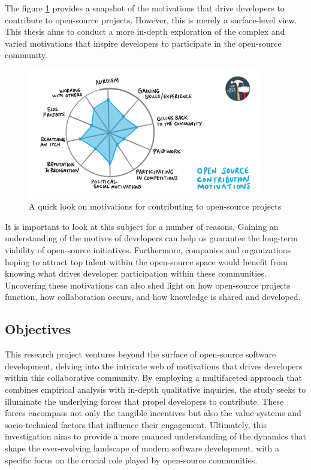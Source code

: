 The figure \ref{fig:illustration} provides a snapshot of the motivations that drive developers to contribute to open-source projects. However, this is merely a surface-level view. This thesis aims to conduct a more in-depth exploration of the complex and varied motivations that inspire developers to participate in the open-source community.

\begin{figure}[ht]
    \centering
    \includegraphics[width=0.9\textwidth]{figs/illustration.png}
    \caption{A quick look on motivations for contributing to open-source projects \cite{Belshaw_2020}}
    \label{fig:illustration}
\end{figure}

It is important to look at this subject for a number of reasons. Gaining an understanding of the motives of developers can help us guarantee the long-term viability of open-source initiatives. Furthermore, companies and organizations hoping to attract top talent within the open-source space would benefit from knowing what drives developer participation within these communities.  Uncovering these motivations can also shed light on how open-source projects function, how collaboration occurs, and how knowledge is shared and developed.

\subsection{Objectives}

This research project ventures beyond the surface of open-source software development, delving into the intricate web of motivations that drives developers within this collaborative community. By employing a multifaceted approach that combines empirical analysis with in-depth qualitative inquiries, the study seeks to illuminate the underlying forces that propel developers to contribute. These forces encompass not only the tangible incentives but also the value systems and socio-technical factors that influence their engagement. Ultimately, this investigation aims to provide a more nuanced understanding of the dynamics that shape the ever-evolving landscape of modern software development, with a specific focus on the crucial role played by open-source communities.

